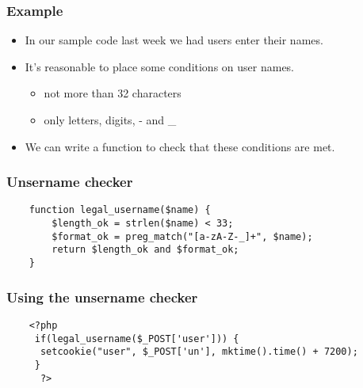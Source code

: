 \documentclass[10pt]{beamer}
\begin{document}
\begin{frame}
	\frametitle{Example}
	\begin{itemize}
		\item In our sample code last week we had users enter
			their names.
		\item It's reasonable to place some conditions on user names.
			\begin{itemize}
				\item not more than 32 characters
				\item only letters, digits, - and \_
			\end{itemize}
		\item We can write a function to check that these
			conditions are met.
	\end{itemize}
\end{frame}

\begin{frame}[fragile]
	\frametitle{Unsername checker}

	\begin{verbatim}
    function legal_username($name) {
        $length_ok = strlen($name) < 33;
        $format_ok = preg_match("[a-zA-Z-_]+", $name);
        return $length_ok and $format_ok;
    }
	\end{verbatim}
\end{frame}
\begin{frame}[fragile]
	\frametitle{Using the unsername checker}

	\begin{verbatim}
    <?php 
     if(legal_username($_POST['user'])) {
      setcookie("user", $_POST['un'], mktime().time() + 7200);
     }
      ?>

	\end{verbatim}
\end{frame}
\end{document}
